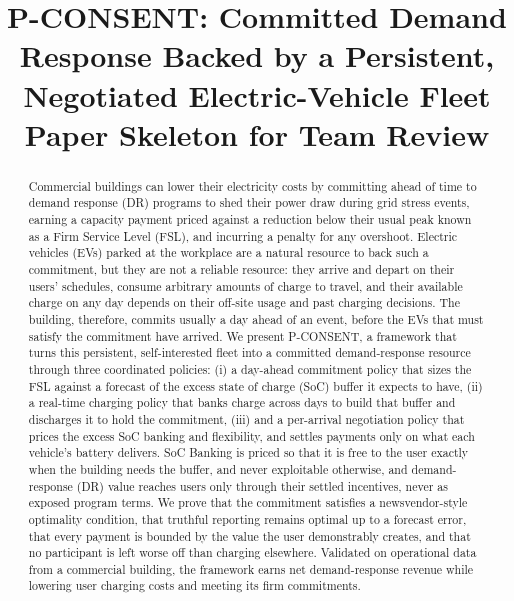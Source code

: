 \documentclass[letterpaper]{article}
\title{P-CONSENT: Committed Demand Response Backed by a Persistent, Negotiated Electric-Vehicle Fleet\\[4pt] {\large Paper Skeleton for Team Review}}
\author{}
\date{}
\begin{document}
\maketitle

\begin{abstract}
Commercial buildings can lower their electricity costs by committing ahead of time to demand response (DR) programs to shed their power draw during grid stress events, earning a capacity payment priced against a reduction below their usual peak known as a Firm Service Level (FSL), and incurring a penalty for any overshoot. Electric vehicles (EVs) parked at the workplace are a natural resource to back such a commitment, but they are not a reliable resource: they arrive and depart on their users' schedules, consume arbitrary amounts of charge to travel, and their available charge on any day depends on their off-site usage and past charging decisions. The building, therefore, commits usually a day ahead of an event, before the EVs that must satisfy the commitment have arrived. We present P-CONSENT, a framework that turns this persistent, self-interested fleet into a committed demand-response resource through three coordinated policies: (i) a day-ahead commitment policy that sizes the FSL against a forecast of the excess state of charge (SoC) buffer it expects to have, (ii) a real-time charging policy that banks charge across days to build that buffer and discharges it to hold the commitment, (iii) and a per-arrival negotiation policy that prices the excess SoC banking and flexibility, and settles payments only on what each vehicle's battery delivers. SoC Banking is priced so that it is free to the user exactly when the building needs the buffer, and never exploitable otherwise, and demand-response (DR) value reaches users only through their settled incentives, never as exposed program terms. We prove that the commitment satisfies a newsvendor-style optimality condition, that truthful reporting remains optimal up to a forecast error, that every payment is bounded by the value the user demonstrably creates, and that no participant is left worse off than charging elsewhere. Validated on operational data from a commercial building, the framework earns net demand-response revenue while lowering user charging costs and meeting its firm commitments.
\end{abstract}



\end{document}
